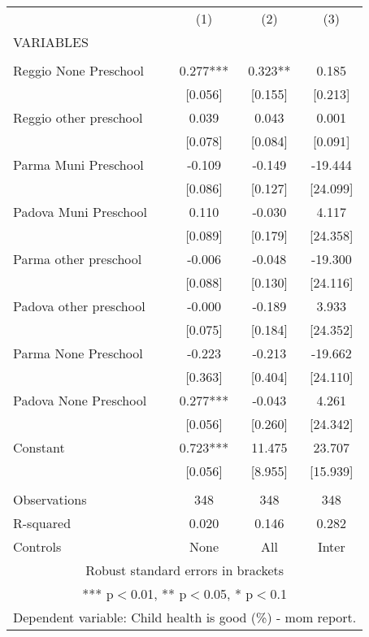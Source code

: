 \begin{tabular}{lccc} \hline
 & (1) & (2) & (3) \\
VARIABLES &  &  &  \\ \hline
 &  &  &  \\
Reggio None Preschool & 0.277*** & 0.323** & 0.185 \\
 & [0.056] & [0.155] & [0.213] \\
Reggio other preschool & 0.039 & 0.043 & 0.001 \\
 & [0.078] & [0.084] & [0.091] \\
Parma Muni Preschool & -0.109 & -0.149 & -19.444 \\
 & [0.086] & [0.127] & [24.099] \\
Padova Muni Preschool & 0.110 & -0.030 & 4.117 \\
 & [0.089] & [0.179] & [24.358] \\
Parma other preschool & -0.006 & -0.048 & -19.300 \\
 & [0.088] & [0.130] & [24.116] \\
Padova other preschool & -0.000 & -0.189 & 3.933 \\
 & [0.075] & [0.184] & [24.352] \\
Parma None Preschool & -0.223 & -0.213 & -19.662 \\
 & [0.363] & [0.404] & [24.110] \\
Padova None Preschool & 0.277*** & -0.043 & 4.261 \\
 & [0.056] & [0.260] & [24.342] \\
Constant & 0.723*** & 11.475 & 23.707 \\
 & [0.056] & [8.955] & [15.939] \\
 &  &  &  \\
Observations & 348 & 348 & 348 \\
R-squared & 0.020 & 0.146 & 0.282 \\
 Controls & None & All & Inter \\ \hline
\multicolumn{4}{c}{ Robust standard errors in brackets} \\
\multicolumn{4}{c}{ *** p$<$0.01, ** p$<$0.05, * p$<$0.1} \\
\multicolumn{4}{c}{ Dependent variable: Child health is good (\%) - mom report.} \\
\end{tabular}
